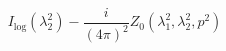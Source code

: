 \begin{equation}
I_{\log }(\lambda _{2}^{2})-\frac{i}{(4\pi )^{2}}Z_{0}(\lambda
_{1}^{2},\lambda _{2}^{2},p^{2})
\end{equation}

